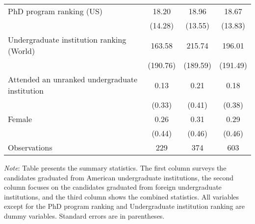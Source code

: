 \begin{table}[h]
{\begin{tabular}{l*{3}{c}}
\quad PhD program ranking (US) &       18.20&       18.96&       18.67\\
                    &     (14.28)&     (13.55)&     (13.83)\\
\quad Undergraduate institution ranking (World) &      163.58&      215.74&      196.01\\
                    &    (190.76)&    (189.59)&    (191.49)\\
\quad Attended an unranked undergraduate institution&        0.13&        0.21&        0.18\\
                    &      (0.33)&      (0.41)&      (0.38)\\
Female              &        0.26&        0.31&        0.29\\
                    &      (0.44)&      (0.46)&      (0.46)\\
\hline
Observations        &         229&         374&         603\\
\hline\hline
\end{tabular}}
\vspace*{0.09cm}
\begin{minipage}{0.95\textwidth} 
{\footnotesize 
\textit{Note}: Table presents the summary statistics. The first column surveys the candidates graduated from American undergraduate institutions, the second column focuses on the candidates graduated from foreign undergraduate institutions, and the third column shows the combined statistics. All variables except for the PhD program ranking and Undergraduate institution ranking are dummy variables. Standard errors are in parentheses.}
\end{minipage}
\end{table}